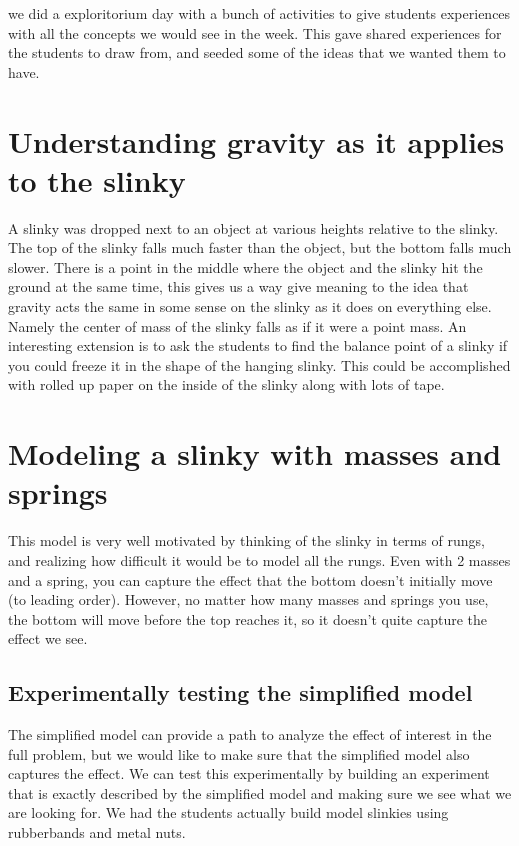 \documentclass[aps,pre,10pt,superscriptaddress,showpacs,amsmath,amssymb,nofootinbib]{revtex4-1}
\begin{document}
we did a exploritorium day with a bunch of activities to give students
experiences with all the concepts we would see in the week.  This gave shared
experiences for the students to draw from, and seeded some of the ideas that we
wanted them to have.

\section{Understanding gravity as it applies to the slinky}
A slinky was dropped next to an object at various heights relative to the
slinky.  The top of the slinky falls much faster than the object, but the bottom
falls much slower.  There is a point in the middle where the object and the
slinky hit the ground at the same time, this gives us a way give meaning to the
idea that gravity acts the same in some sense on the slinky as it does on
everything else. Namely the center of mass of the slinky falls as if it were a
point mass. An interesting extension is to ask the students to find the balance
point of a slinky if you could freeze it in the shape of the hanging slinky. 
This could be accomplished with rolled up paper on the inside of the slinky
along with lots of tape.



\section{Modeling a slinky with masses and springs}

This model is very well motivated by thinking of the slinky in terms of rungs,
and realizing how difficult it would be to model all the rungs.  Even with 2
masses and a spring, you can capture the effect that the bottom doesn't
initially move (to leading order).  However, no matter how many masses and
springs you use, the bottom will move before the top reaches it, so it doesn't
quite capture the effect we see.

\subsection{Experimentally testing the simplified model}
The simplified model can provide a path to analyze the effect of interest in the
full problem, but we would like to make sure that the simplified model also
captures the effect.  We can test this experimentally by building an experiment
that is exactly described by the simplified model and making sure we see what we
are looking for.  We had the students actually build model slinkies using
rubberbands and metal nuts.
\end{document}

